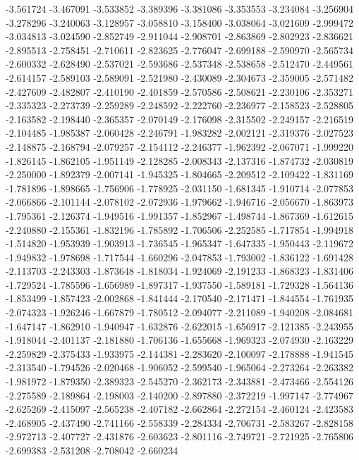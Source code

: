 -3.561724
-3.467091
-3.533852
-3.389396
-3.381086
-3.353553
-3.234084
-3.256904
-3.278296
-3.240063
-3.128957
-3.058810
-3.158400
-3.038064
-3.021609
-2.999472
-3.034813
-3.024590
-2.852749
-2.911044
-2.908701
-2.863869
-2.802923
-2.836621
-2.895513
-2.758451
-2.710611
-2.823625
-2.776047
-2.699188
-2.590970
-2.565734
-2.600332
-2.628490
-2.537021
-2.593686
-2.537348
-2.538658
-2.512470
-2.449561
-2.614157
-2.589103
-2.589091
-2.521980
-2.430089
-2.304673
-2.359005
-2.571482
-2.427609
-2.482807
-2.410190
-2.401859
-2.570586
-2.508621
-2.230106
-2.353271
-2.335323
-2.273739
-2.259289
-2.248592
-2.222760
-2.236977
-2.158523
-2.528805
-2.163582
-2.198440
-2.365357
-2.070149
-2.176098
-2.315502
-2.249157
-2.216519
-2.104485
-1.985387
-2.060428
-2.246791
-1.983282
-2.002121
-2.319376
-2.027523
-2.148875
-2.168794
-2.079257
-2.154112
-2.246377
-1.962392
-2.067071
-1.999220
-1.826145
-1.862105
-1.951149
-2.128285
-2.008343
-2.137316
-1.874732
-2.030819
-2.250000
-1.892379
-2.007141
-1.945325
-1.804665
-2.209512
-2.109422
-1.831169
-1.781896
-1.898665
-1.756906
-1.778925
-2.031150
-1.681345
-1.910714
-2.077853
-2.066866
-2.101144
-2.078102
-2.072936
-1.979662
-1.946716
-2.056670
-1.863973
-1.795361
-2.126374
-1.949516
-1.991357
-1.852967
-1.498744
-1.867369
-1.612615
-2.240880
-2.155361
-1.832196
-1.785892
-1.706506
-2.252585
-1.717854
-1.994918
-1.514820
-1.953939
-1.903913
-1.736545
-1.965347
-1.647335
-1.950443
-2.119672
-1.949832
-1.978698
-1.717544
-1.660296
-2.047853
-1.793002
-1.836122
-1.691428
-2.113703
-2.243303
-1.873648
-1.818034
-1.924069
-2.191233
-1.868323
-1.831406
-1.729524
-1.785596
-1.656989
-1.897317
-1.937550
-1.589181
-1.729328
-1.564136
-1.853499
-1.857423
-2.002868
-1.841444
-2.170540
-2.171471
-1.844554
-1.761935
-2.074323
-1.926246
-1.667879
-1.780512
-2.094077
-2.211089
-1.940208
-2.084681
-1.647147
-1.862910
-1.940947
-1.632876
-2.622015
-1.656917
-2.121385
-2.243955
-1.918044
-2.401137
-2.181880
-1.706136
-1.655668
-1.969323
-2.074930
-2.163229
-2.259829
-2.375433
-1.933975
-2.144381
-2.283620
-2.100097
-2.178888
-1.941545
-2.313540
-1.794526
-2.020468
-1.906052
-2.599540
-1.965064
-2.273264
-2.263382
-1.981972
-1.879350
-2.389323
-2.545270
-2.362173
-2.343881
-2.473466
-2.554126
-2.275589
-2.189864
-2.198003
-2.140200
-2.897880
-2.372219
-1.997147
-2.774967
-2.625269
-2.415097
-2.565238
-2.407182
-2.662864
-2.272154
-2.460124
-2.423583
-2.468905
-2.437490
-2.741166
-2.558339
-2.284334
-2.706731
-2.583267
-2.828158
-2.972713
-2.407727
-2.431876
-2.603623
-2.801116
-2.749721
-2.721925
-2.765806
-2.699383
-2.531208
-2.708042
-2.660234
